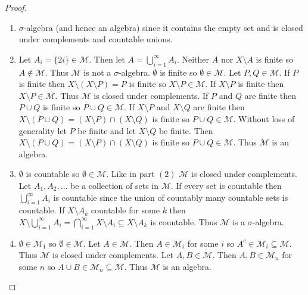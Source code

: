 \documentclass{article}
\begin{document}
\begin{proof}
\begin{enumerate}
    \item $\sigma$-algebra (and hence an algebra) since it contains the empty set and is closed under complements and countable unions.
    \item Let $A_i=\{2i\}\in\mathcal{M}$. Then let $A=\bigcup_{i=1}^\infty A_i$. Neither $A$ nor $X\setminus A$ is finite so $A\not\in\mathcal{M}$. Thus $\mathcal{M}$ is not a $\sigma$-algebra. $\emptyset$ is finite so $\emptyset\in\mathcal{M}$. Let $P,Q\in\mathcal{M}$. If $P$ is finite then $X\setminus(X\setminus P)=P$ is finite so $X\setminus P\in\mathcal{M}$. If $X\setminus P$ is finite then $X\setminus P\in\mathcal{M}$. Thus $\mathcal{M}$ is closed under complements. If $P$ and $Q$ are finite then $P\cup Q$ is finite so $P\cup Q\in\mathcal{M}$. If $X\setminus P$ and $X\setminus Q$ are finite then $X\setminus(P\cup Q)=(X\setminus P)\cap(X\setminus Q)$ is finite so $P\cup Q\in\mathcal{M}$. Without loss of generality let $P$ be finite and let $X\setminus Q$ be finite. Then $X\setminus(P\cup Q)=(X\setminus P)\cap(X\setminus Q)$ is finite so $P\cup Q\in\mathcal{M}$. Thus $\mathcal{M}$ is an algebra.
    \item $\emptyset$ is countable so $\emptyset\in\mathcal{M}$. Like in part $(2)$ $\mathcal{M}$ is closed under complements. Let $A_1,A_2,...$ be a collection of sets in $\mathcal{M}$. If every set is countable then $\bigcup_{i=1}^\infty A_i$ is countable since the union of countably many countable sets is countable. If $X\setminus A_k$ countable for some $k$ then $X\setminus\bigcup_{i=1}^\infty A_i=\bigcap_{i=1}^\infty X\setminus A_i\subseteq X\setminus A_k$ is countable. Thus $\mathcal{M}$ is a $\sigma$-algebra.
    \item $\emptyset\in\mathcal{M}_1$ so $\emptyset\in\mathcal{M}$. Let $A\in\mathcal{M}$. Then $A\in\mathcal{M}_i$ for some $i$ so $A^c\in\mathcal{M}_i\subseteq\mathcal{M}$. Thus $\mathcal{M}$ is closed under complements. Let $A,B\in\mathcal{M}$. Then $A,B\in\mathcal{M}_n$ for some $n$ so $A\cup B\in\mathcal{M}_n\subseteq\mathcal{M}$. Thus $\mathcal{M}$ is an algebra.


\end{enumerate}
\end{proof}
\end{document}
